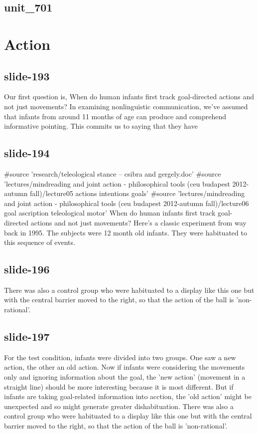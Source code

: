 \documentclass[12pt,\papersize]{extarticle}
\begin{document}
 
\subsection{unit\_701}
 
\section{Action}
 
 
\subsection{slide-193}
Our first question is, When do human infants first track goal-directed actions and not just movements?
In examining nonlinguistic communication, we've assumed that infants from around 11 months of age can produce and comprehend informative pointing.
This commits us to saying that they have
 
 
\subsection{slide-194}
\#source 'research/teleological stance -- csibra and gergely.doc'
\#source 'lectures/mindreading and joint action - philosophical tools (ceu budapest 2012-autumn fall)/lecture05 actions intentions goals'
\#source 'lectures/mindreading and joint action - philosophical tools (ceu budapest 2012-autumn fall)/lecture06 goal ascription teleological motor'
When do human infants first track goal-directed actions and not just movements?
Here's a classic experiment from way back in 1995.
The subjects were 12 month old infants.
They were habituated to this sequence of events.
 
 
\subsection{slide-196}
There was also a control group who were habituated to a display like this one but with the central barrier moved to the right, so that the action of the ball is 'non-rational'.
 
 
\subsection{slide-197}
For the test condition, infants were divided into two groups. One saw a new action, the other an old action.
Now if infants were considering the movements only and ignoring information about the goal, the 'new action' (movement in a straight line) should be more interesting because it is most different.
But if infants are taking goal-related information into acction, the 'old action' might be unexpected and so might generate greater dishabituation.
There was also a control group who were habituated to a display like this one but with the central barrier moved to the right, so that the action of the ball is 'non-rational'.
 
\end{document}
